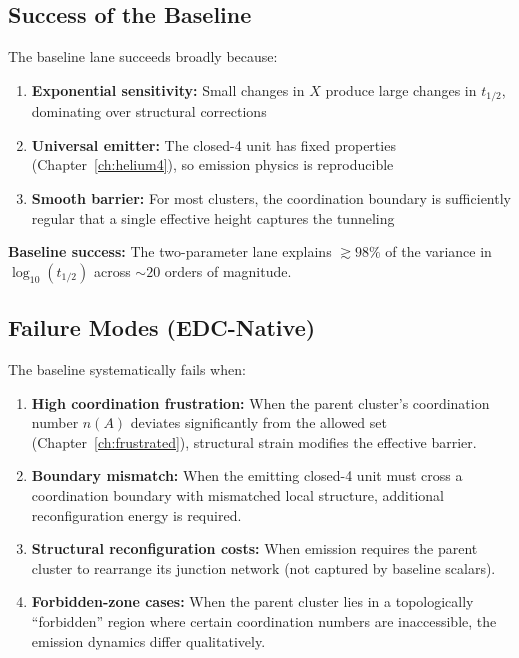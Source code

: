 \subsection{Success of the Baseline}

The baseline lane succeeds broadly because:

\begin{enumerate}
    \item \textbf{Exponential sensitivity:} Small changes in $X$ produce
          large changes in $t_{1/2}$, dominating over structural corrections
    \item \textbf{Universal emitter:} The closed-4 unit has fixed properties
          (Chapter~\ref{ch:helium4}), so emission physics is reproducible
    \item \textbf{Smooth barrier:} For most clusters, the coordination
          boundary is sufficiently regular that a single effective height
          captures the tunneling
\end{enumerate}

\begin{resultbox}
    \textbf{Baseline success:} The two-parameter lane explains $\gtrsim 98\%$
    of the variance in $\log_{10}(t_{1/2})$ across $\sim 20$ orders of magnitude.
    \tagBL
\end{resultbox}

\subsection{Failure Modes (EDC-Native)}

The baseline systematically fails when:

\begin{enumerate}
    \item \textbf{High coordination frustration:}
          When the parent cluster's coordination number $n(A)$ deviates
          significantly from the allowed set (Chapter~\ref{ch:frustrated}),
          structural strain modifies the effective barrier.
          \tagP

    \item \textbf{Boundary mismatch:}
          When the emitting closed-4 unit must cross a coordination boundary
          with mismatched local structure, additional reconfiguration energy
          is required.
          \tagP

    \item \textbf{Structural reconfiguration costs:}
          When emission requires the parent cluster to rearrange its
          junction network (not captured by baseline scalars).
          \tagP

    \item \textbf{Forbidden-zone cases:}
          When the parent cluster lies in a topologically ``forbidden''
          region where certain coordination numbers are inaccessible,
          the emission dynamics differ qualitatively.
          \tagP
\end{enumerate}

